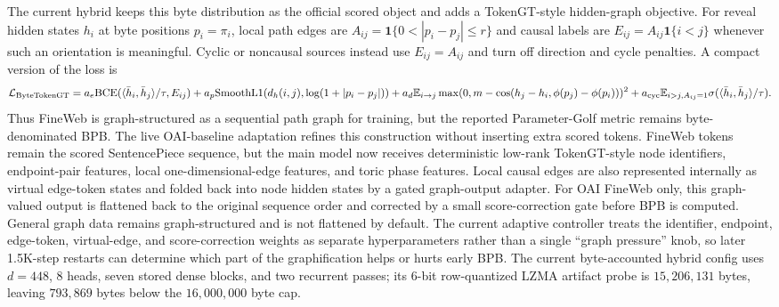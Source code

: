 \documentclass[10pt]{article}
\theoremstyle{definition}
\theoremstyle{plain}
\theoremstyle{remark}
\begin{document}
The current hybrid keeps this byte distribution as the official scored object
and adds a TokenGT-style hidden-graph objective.  For reveal hidden states
$h_i$ at byte positions $p_i=\pi_i$, local path edges are
$A_{ij}=\mathbf 1\{0<|p_i-p_j|\le r\}$ and causal labels are
$E_{ij}=A_{ij}\mathbf 1\{i<j\}$ whenever such an orientation is meaningful.
Cyclic or noncausal sources instead use $E_{ij}=A_{ij}$ and turn off direction
and cycle penalties.  A compact version of the loss is
\[
  \mathcal L_{\rm ByteTokenGT}
  =
  a_e{\rm BCE}(\langle\bar h_i,\bar h_j\rangle/\tau,E_{ij})
  +a_p{\rm SmoothL1}(d_h(i,j),\log(1+|p_i-p_j|))
  +a_d\mathbb E_{i\to j}\max(0,m-\cos(h_j-h_i,\phi(p_j)-\phi(p_i)))^2
  +a_{\rm cyc}\mathbb E_{i>j,A_{ij}=1}\sigma(\langle\bar h_i,\bar h_j\rangle/\tau).
\]
Thus FineWeb is graph-structured as a sequential path graph for training, but
the reported Parameter-Golf metric remains byte-denominated BPB.
The live OAI-baseline adaptation refines this construction without inserting
extra scored tokens.  FineWeb tokens remain the scored SentencePiece sequence,
but the main model now receives deterministic low-rank TokenGT-style node
identifiers, endpoint-pair features, local one-dimensional-edge features, and
toric phase features.  Local causal edges are also represented internally as
virtual edge-token states and folded back into node hidden states by a gated
graph-output adapter.  For OAI FineWeb only, this graph-valued output is
flattened back to the original sequence order and corrected by a small
score-correction gate before BPB is computed.  General graph data remains
graph-structured and is not flattened by default.  The current adaptive
controller treats the identifier, endpoint, edge-token, virtual-edge, and
score-correction weights as separate hyperparameters rather than a single
``graph pressure'' knob, so later 1.5K-step restarts can determine which part
of the graphification helps or hurts early BPB.
The current byte-accounted hybrid config uses $d=448$, $8$ heads, seven stored
dense blocks, and two recurrent passes; its 6-bit row-quantized LZMA artifact
probe is $15{,}206{,}131$ bytes, leaving $793{,}869$ bytes below the
$16{,}000{,}000$ byte cap.
\end{document}
